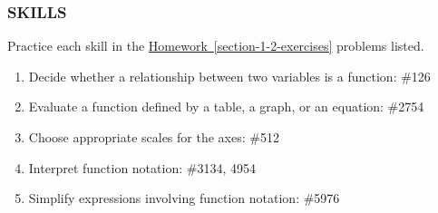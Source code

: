 \documentclass[10pt,]{book}
\theoremstyle{plain}
\theoremstyle{definition}
\theoremstyle{definition}
\theoremstyle{definition}
\begin{document}
\subsubsection[{SKILLS}]{SKILLS}\label{subsubsection-4}
Practice each skill in the \hyperref[section-1-2-exercises]{Homework~\ref{section-1-2-exercises}} problems listed. \leavevmode%
\begin{enumerate}[label=\arabic*]
\item\hypertarget{li-77}{}Decide whether a relationship between two variables is a function: \#1\textendash{}26%
\item\hypertarget{li-78}{}Evaluate a function defined by a table, a graph, or an equation: \#27\textendash{}54%
\item\hypertarget{li-79}{}Choose appropriate scales for the axes: \#5\textendash{}12%
\item\hypertarget{li-80}{}Interpret function notation: \#31\textendash{}34, 49\textendash{}54%
\item\hypertarget{li-81}{}Simplify expressions involving function notation: \#59\textendash{}76%
\end{enumerate}
%
\typeout{************************************************}
\typeout{************************************************}
\end{document}
